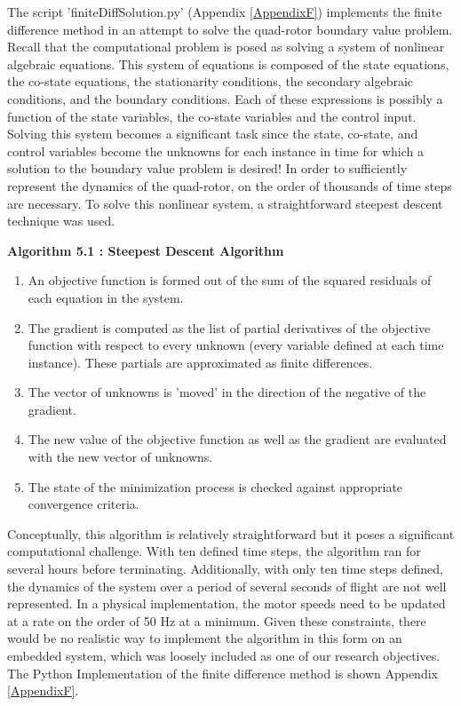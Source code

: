 The script 'finiteDiffSolution.py' (Appendix \ref{AppendixF}) implements the finite difference method in an attempt to solve the quad-rotor boundary value problem. Recall that the computational problem is posed as solving a system of nonlinear algebraic equations. This system of equations is composed of the state equations, the co-state equations, the stationarity conditions, the secondary algebraic conditions, and the boundary conditions. Each of these expressions is possibly a function of the state variables, the co-state variables and the control input. Solving this system becomes a significant task since the state, co-state, and control variables become the unknowns for each instance in time for which a solution to the boundary value problem is desired! In order to sufficiently represent the dynamics of the quad-rotor, on the order of thousands of time steps are necessary. To solve this nonlinear system, a straightforward steepest descent technique was used.
\newpage

\begin{center}\textbf{Algorithm 5.1 : Steepest Descent Algorithm}\end{center}
\begin{enumerate}
    \item{An objective function is formed out of the sum of the squared residuals of each equation in the system.}
    \item{The gradient is computed as the list of partial derivatives of the objective function with respect to every unknown (every variable defined at each time instance). These partials are approximated as finite differences.}
    \item{The vector of unknowns is 'moved' in the direction of the negative of the gradient.}
    \item{The new value of the objective function as well as the gradient are evaluated with the new vector of unknowns. }
    \item{The state of the minimization process is checked against appropriate convergence criteria.}
\end{enumerate}

Conceptually, this algorithm is relatively straightforward but it poses a significant computational challenge. With ten defined time steps, the algorithm ran for several hours before terminating. Additionally, with only ten time steps defined, the dynamics of the system over a period of several seconds of flight are not well represented. In a physical implementation, the motor speeds need to be updated at a rate on the order of 50 Hz at a minimum. Given  these constraints, there would be no realistic way to implement the algorithm in this form on an embedded system, which was loosely included as one of our research objectives. The Python Implementation of the finite difference method is shown Appendix \ref{AppendixF}.

